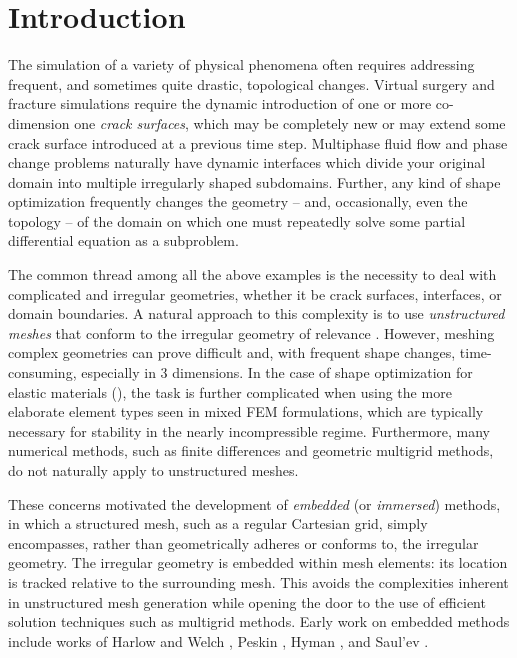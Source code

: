 %

\part{Introduction} \label{pt:introduction}

The simulation of a variety of physical phenomena often requires addressing frequent, and sometimes quite drastic, topological changes. Virtual surgery and fracture simulations require the dynamic introduction of one or more co-dimension one \emph{crack surfaces}, which may be completely new or may extend some crack surface introduced at a previous time step. Multiphase fluid flow and phase change problems naturally have dynamic interfaces which divide your original domain into multiple irregularly shaped subdomains. Further, any kind of shape optimization frequently changes the geometry -- and, occasionally, even the topology -- of the domain on which one must repeatedly solve some partial differential equation as a subproblem.

The common thread among all the above examples is the necessity to deal with complicated and irregular geometries, whether it be crack surfaces, interfaces, or domain boundaries. A natural approach to this complexity is to use \emph{unstructured meshes} that conform to the irregular geometry of relevance \cite{Babuska70, Bramble96, Wohlmuth99, Chen.Zhiming96, Huang02, Lamichhane04, Dryja05, Cockburn09}. However, meshing complex geometries can prove difficult and, with frequent shape changes, time-consuming, especially in $3$ dimensions. In the case of shape optimization for elastic materials (\cite{Sethian00, Osher01, Allaire04, Duysinx06, Challis08, Wei.Peng08}), the task is further complicated when using the more elaborate element types seen in mixed FEM formulations, which are typically necessary for stability in the nearly incompressible regime. Furthermore, many numerical methods, such as finite differences and geometric multigrid methods, do not naturally apply to unstructured meshes.

These concerns motivated the development of \emph{embedded} (or \emph{immersed}) methods, in which a structured mesh, such as a regular Cartesian grid, simply encompasses, rather than geometrically adheres or conforms to, the irregular geometry. The irregular geometry is embedded within mesh elements: its location is tracked relative to the surrounding mesh. This avoids the complexities inherent in unstructured mesh generation while opening the door to the use of efficient solution techniques such as multigrid methods. Early work on embedded methods include works of Harlow and Welch \cite{Harlow65}, Peskin \cite{Peskin72}, Hyman \cite{Hyman52}, and Saul'ev \cite{Saul'ev63}.

